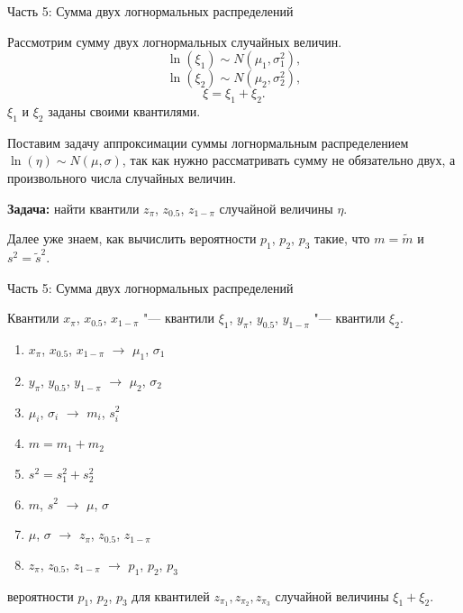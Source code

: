 \documentclass[ucs, notheorems, handout]{beamer}
\newenvironment{pr1}{\par\noindent{\bf Дано:}}{}
\newenvironment{pr3}{\par\noindent{\bf Результат:}}{}
\begin{document}
\begin{frame}{Часть 5: Сумма двух логнормальных распределений }
	
		Рассмотрим сумму двух логнормальных случайных величин.
	\begin{equation*}
		\ln(\xi_{1}) \sim N(\mu_{1}, \sigma _{1}^{2}),
	\end{equation*}
	\begin{equation*}
		\ln(\xi_{2}) \sim N(\mu_{2}, \sigma _{2}^{2}),
	\end{equation*}
	\begin{equation*}
		\xi = \xi_{1}+\xi_{2}.
	\end{equation*}
	$\xi_{1}$ и $\xi_{2}$ заданы своими квантилями.
	\bigskip
	
	Поставим задачу аппроксимации суммы логнормальным распределением $\ln(\eta)\sim N(\mu, \sigma)$, так как нужно рассматривать сумму не обязательно двух, а произвольного числа случайных величин. 
	
	\bigskip
	
	\textbf{Задача:} найти квантили $z_{\pi}$, $z_{0.5}$, $z_{1-\pi}$ случайной величины $\eta$.
	
	\bigskip
	
	Далее уже знаем, как вычислить вероятности $p_{1}$, $p_{2}$, $p_{3}$ такие, что $m = \tilde{m}$  и $s^{2} = \tilde{s}^{2}$.

	
\end{frame}

\begin{frame}{Часть 5: Сумма двух логнормальных распределений}
	
	\begin{pr1}
		Квантили $x_{\pi}$, $x_{0.5}$, $x_{1-\pi}$ "--- квантили $\xi_{1}$, $y_{\pi}$, $y_{0.5}$, $y_{1-\pi}$ "--- квантили $\xi_{2}$.
	\end{pr1}
	\begin{enumerate}
		\item $x_{\pi}$, $x_{0.5}$, $x_{1-\pi}$ $\rightarrow$  $\mu_{1}$, $\sigma_{1}$
		\item $y_{\pi}$, $y_{0.5}$, $y_{1-\pi}$ $\rightarrow$ $\mu_{2}$, $\sigma_{2}$
		\item $\mu_{i}$, $\sigma_{i}$ $\rightarrow$ $m_{i}$, $s_{i}^{2}$
		\item $m = m_{1}+m_{2}$
		\item $s^{2}=s_{1}^{2} + s_{2}^{2}$
		\item $m$, $s^{2}$ $\rightarrow$ $\mu$, $\sigma$
		\item $\mu$, $\sigma$ $\rightarrow$ $z_{\pi}$, $z_{0.5}$, $z_{1-\pi}$
		\item $z_{\pi}$, $z_{0.5}$, $z_{1-\pi}$ $\rightarrow$ $p_{1}$, $p_{2}$, $p_{3}$
		
	\end{enumerate}
\begin{pr3}\end{pr3} вероятности $p_{1}$, $p_{2}$, $p_{3}$ для квантилей $z_{\pi_{1}}, z_{\pi_{2}}, z_{\pi_{3}}$ случайной величины $\xi_{1} + \xi_{2}$.
	
\end{frame}
	
\end{document}
